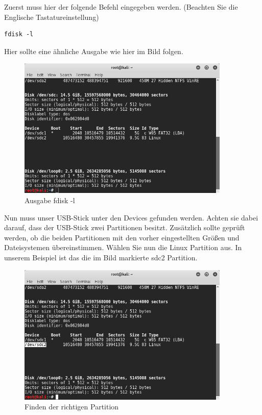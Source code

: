 Zuerst muss hier der folgende Befehl eingegeben werden. (Beachten Sie die Englische Tastatureinstellung)
\begin{lstlisting}
fdisk -l
\end{lstlisting}
Hier sollte eine ähnliche Ausgabe wie hier im Bild folgen. 

	\begin{figure}[H]
		\centering
		\includegraphics[width=0.9\textwidth]{images/prep/fdisk.png}
		\caption{Ausgabe fdisk -l}
		\label{fig:fdsik output}
	\end{figure}

Nun muss unser USB-Stick unter den Devices gefunden werden. Achten sie dabei darauf, dass der USB-Stick zwei Partitionen besitzt. Zusätzlich sollte geprüft werden, ob die beiden Partitionen mit den vorher eingestellten Größen und Dateisystemen übereinstimmen.
Wählen Sie nun die Linux Partition aus. In unserem Beispiel ist das die im Bild markierte sdc2 Partition.

	\begin{figure}[H]
		\centering
		\includegraphics[width=0.9\textwidth]{images/prep/fdisk_marked.png}
		\caption{Finden der richtigen Partition}
		\label{fig:fdisk partition}
	\end{figure}

